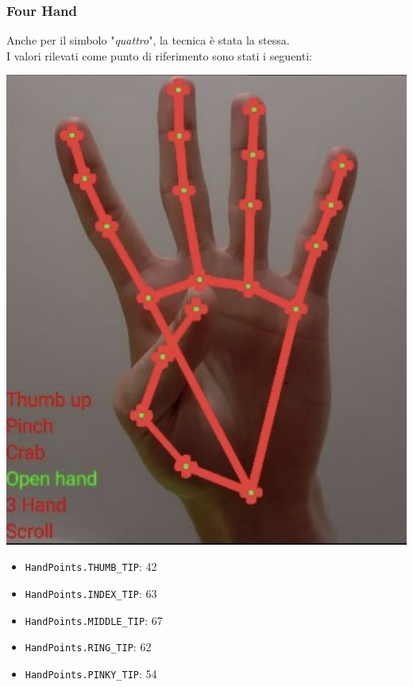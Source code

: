 \subsubsection{Four Hand}
Anche per il simbolo "\textit{quattro}", la tecnica è stata la stessa.\\
I valori rilevati come punto di riferimento sono stati i seguenti:
\begin{multicols}{2}
    \begin{multicolfigure}
        \centering
        \includegraphics[width=\textwidth]{images/four_hand.png}
    \end{multicolfigure}
    \columnbreak
    \begin{itemize}
        \item \texttt{HandPoints.THUMB\_TIP}: 42
        \item \texttt{HandPoints.INDEX\_TIP}: 63
        \item \texttt{HandPoints.MIDDLE\_TIP}: 67
        \item \texttt{HandPoints.RING\_TIP}: 62
        \item \texttt{HandPoints.PINKY\_TIP}: 54
    \end{itemize} 
\end{multicols}


